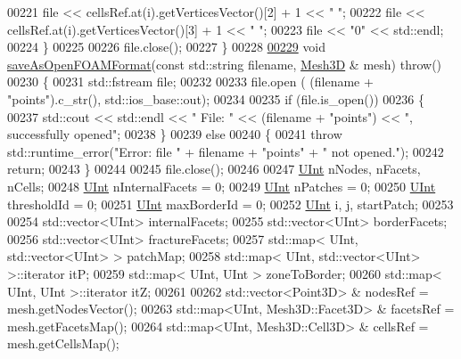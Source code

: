 \begin{DoxyCode}
00221         file << cellsRef.at(i).getVerticesVector()[2] + 1 << \textcolor{stringliteral}{"  "};
00222         file << cellsRef.at(i).getVerticesVector()[3] + 1 << \textcolor{stringliteral}{"  "};
00223         file << \textcolor{stringliteral}{"0"} << std::endl;
00224     \}
00225 
00226     file.close();
00227 \}
00228 
\hypertarget{Converter_8cpp_source.tex_l00229}{}\hyperlink{namespaceFVCode3D_a2f158b0ae2187840985b44465f65e126}{00229} \textcolor{keywordtype}{void} \hyperlink{namespaceFVCode3D_a2f158b0ae2187840985b44465f65e126}{saveAsOpenFOAMFormat}(\textcolor{keyword}{const} std::string filename, \hyperlink{classFVCode3D_1_1Mesh3D}{Mesh3D} & mesh) \textcolor{keywordflow}{throw}()
00230 \{
00231     std::fstream file;
00232 
00233     file.open ( (filename + \textcolor{stringliteral}{"points"}).c\_str(), std::ios\_base::out);
00234 
00235     \textcolor{keywordflow}{if} (file.is\_open())
00236     \{
00237         std::cout << std::endl << \textcolor{stringliteral}{" File: "} << (filename + \textcolor{stringliteral}{"points"}) << \textcolor{stringliteral}{", successfully opened"};
00238     \}
00239     \textcolor{keywordflow}{else}
00240     \{
00241         \textcolor{keywordflow}{throw} std::runtime\_error(\textcolor{stringliteral}{"Error: file "} + filename + \textcolor{stringliteral}{"points"} + \textcolor{stringliteral}{" not opened."});
00242         \textcolor{keywordflow}{return};
00243     \}
00244 
00245     file.close();
00246 
00247     \hyperlink{namespaceFVCode3D_a4bf7e328c75d0fd504050d040ebe9eda}{UInt} nNodes, nFacets, nCells;
00248     \hyperlink{namespaceFVCode3D_a4bf7e328c75d0fd504050d040ebe9eda}{UInt} nInternalFacets = 0;
00249     \hyperlink{namespaceFVCode3D_a4bf7e328c75d0fd504050d040ebe9eda}{UInt} nPatches = 0;
00250     \hyperlink{namespaceFVCode3D_a4bf7e328c75d0fd504050d040ebe9eda}{UInt} thresholdId = 0;
00251     \hyperlink{namespaceFVCode3D_a4bf7e328c75d0fd504050d040ebe9eda}{UInt} maxBorderId = 0;
00252     \hyperlink{namespaceFVCode3D_a4bf7e328c75d0fd504050d040ebe9eda}{UInt} i, j, startPatch;
00253 
00254     std::vector<UInt> internalFacets;
00255     std::vector<UInt> borderFacets;
00256     std::vector<UInt> fractureFacets;
00257     std::map< UInt, std::vector<UInt> > patchMap;
00258     std::map< UInt, std::vector<UInt> >::iterator itP;
00259     std::map< UInt, UInt > zoneToBorder;
00260     std::map< UInt, UInt >::iterator itZ;
00261 
00262     std::vector<Point3D> & nodesRef = mesh.getNodesVector();
00263     std::map<UInt, Mesh3D::Facet3D> & facetsRef = mesh.getFacetsMap();
00264     std::map<UInt, Mesh3D::Cell3D> & cellsRef = mesh.getCellsMap();

\end{DoxyCode}
